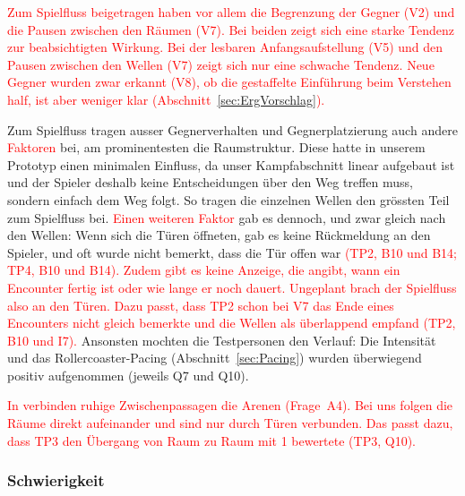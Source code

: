 \documentclass[../Main.tex]{subfiles}
\begin{document}
\textcolor{red}{Zum Spielfluss beigetragen haben vor allem die Begrenzung der Gegner (V2) und die Pausen zwischen den Räumen (V7). Bei beiden zeigt sich eine starke Tendenz zur beabsichtigten Wirkung. Bei der lesbaren Anfangsaufstellung (V5) und den Pausen zwischen den Wellen (V7) zeigt sich nur eine schwache Tendenz. Neue Gegner wurden zwar erkannt (V8), ob die gestaffelte Einführung beim Verstehen half, ist aber weniger klar (Abschnitt~\ref{sec:ErgVorschlag}).}

Zum Spielfluss tragen ausser Gegnerverhalten und Gegnerplatzierung auch andere \textcolor{red}{Faktoren} bei, am prominentesten die Raumstruktur. Diese hatte in unserem Prototyp einen minimalen Einfluss, da unser Kampfabschnitt linear aufgebaut ist und der Spieler deshalb keine Entscheidungen über den Weg treffen muss, sondern einfach dem Weg folgt. So tragen die einzelnen Wellen den grössten Teil zum Spielfluss bei. \textcolor{red}{Einen weiteren Faktor} gab es dennoch, und zwar gleich nach den Wellen: Wenn sich die Türen öffneten, gab es keine Rückmeldung an den Spieler, und oft wurde nicht bemerkt, dass die Tür offen war \textcolor{red}{(TP2, B10 und B14; TP4, B10 und B14). Zudem gibt es keine Anzeige, die angibt, wann ein Encounter fertig ist oder wie lange er noch dauert. Ungeplant brach der Spielfluss also an den Türen. Dazu passt, dass TP2 schon bei V7 das Ende eines Encounters nicht gleich bemerkte und die Wellen als überlappend empfand (TP2, B10 und I7).} Ansonsten mochten die Testpersonen den Verlauf: Die Intensität und das Rollercoaster-Pacing (Abschnitt~\ref{sec:Pacing}) wurden überwiegend positiv aufgenommen (jeweils Q7 und Q10).

\textcolor{red}{In  verbinden ruhige Zwischenpassagen die Arenen (Frage~A4). Bei uns folgen die Räume direkt aufeinander und sind nur durch Türen verbunden. Das passt dazu, dass TP3 den Übergang von Raum zu Raum mit 1 bewertete (TP3, Q10).}

\subsubsection{Schwierigkeit}
\end{document}
